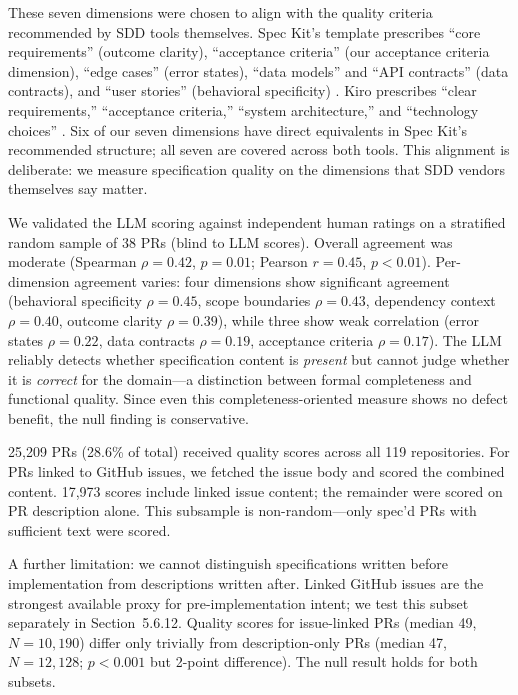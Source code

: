 \documentclass[a4paper,UKenglish,cleveref,autoref,thm-restate]{lipics-v2021}
\begin{document}
These seven dimensions were chosen to align with the quality criteria recommended by SDD tools themselves. Spec Kit's template prescribes ``core requirements'' (outcome clarity), ``acceptance criteria'' (our acceptance criteria dimension), ``edge cases'' (error states), ``data models'' and ``API contracts'' (data contracts), and ``user stories'' (behavioral specificity) \cite{speckit2025}. Kiro prescribes ``clear requirements,'' ``acceptance criteria,'' ``system architecture,'' and ``technology choices'' \cite{kiro2025b}. Six of our seven dimensions have direct equivalents in Spec Kit's recommended structure; all seven are covered across both tools. This alignment is deliberate: we measure specification quality on the dimensions that SDD vendors themselves say matter.

We validated the LLM scoring against independent human ratings on a stratified random sample of 38 PRs (blind to LLM scores). Overall agreement was moderate (Spearman $\rho = 0.42$, $p = 0.01$; Pearson $r = 0.45$, $p < 0.01$). Per-dimension agreement varies: four dimensions show significant agreement (behavioral specificity $\rho = 0.45$, scope boundaries $\rho = 0.43$, dependency context $\rho = 0.40$, outcome clarity $\rho = 0.39$), while three show weak correlation (error states $\rho = 0.22$, data contracts $\rho = 0.19$, acceptance criteria $\rho = 0.17$). The LLM reliably detects whether specification content is \emph{present} but cannot judge whether it is \emph{correct} for the domain---a distinction between formal completeness and functional quality. Since even this completeness-oriented measure shows no defect benefit, the null finding is conservative.

25,209 PRs (28.6\% of total) received quality scores across all 119 repositories. For PRs linked to GitHub issues, we fetched the issue body and scored the combined content. 17,973 scores include linked issue content; the remainder were scored on PR description alone. This subsample is non-random---only spec'd PRs with sufficient text were scored.

A further limitation: we cannot distinguish specifications written before implementation from descriptions written after. Linked GitHub issues are the strongest available proxy for pre-implementation intent; we test this subset separately in Section~5.6.12. Quality scores for issue-linked PRs (median 49, $N = 10{,}190$) differ only trivially from description-only PRs (median 47, $N = 12{,}128$; $p < 0.001$ but 2-point difference). The null result holds for both subsets.
\end{document}
